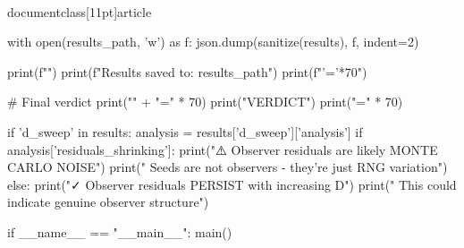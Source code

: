 \\documentclass[11pt]{article}
\begin{document}
\begin{CodeBlock}
    with open(results_path, 'w') as f:
        json.dump(sanitize(results), f, indent=2)
    
    print(f"")
    print(f"Results saved to: {results_path}")
    print(f"{'='*70}")
    
    # Final verdict
    print("\n" + "=" * 70)
    print("VERDICT")
    print("=" * 70)
    
    if 'd_sweep' in results:
        analysis = results['d_sweep']['analysis']
        if analysis['residuals_shrinking']:
            print("⚠️  Observer residuals are likely MONTE CARLO NOISE")
            print("    Seeds are not observers - they're just RNG variation")
        else:
            print("✓  Observer residuals PERSIST with increasing D")
            print("    This could indicate genuine observer structure")


if __name__ == "__main__":
    main()

\end{CodeBlock}
\end{document}
